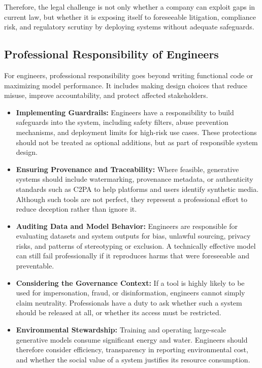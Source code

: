 Therefore, the legal challenge is not only whether a company can exploit gaps in current law, but whether it is exposing itself to foreseeable litigation, compliance risk, and regulatory scrutiny by deploying systems without adequate safeguards.

\subsection{Professional Responsibility of Engineers}

For engineers, professional responsibility goes beyond writing functional code or maximizing model performance. It includes making design choices that reduce misuse, improve accountability, and protect affected stakeholders.

\begin{itemize}
    \item \textbf{Implementing Guardrails:} Engineers have a responsibility to build safeguards into the system, including safety filters, abuse prevention mechanisms, and deployment limits for high-risk use cases. These protections should not be treated as optional additions, but as part of responsible system design.

    \item \textbf{Ensuring Provenance and Traceability:} Where feasible, generative systems should include watermarking, provenance metadata, or authenticity standards such as C2PA to help platforms and users identify synthetic media. Although such tools are not perfect, they represent a professional effort to reduce deception rather than ignore it.

    \item \textbf{Auditing Data and Model Behavior:} Engineers are responsible for evaluating datasets and system outputs for bias, unlawful sourcing, privacy risks, and patterns of stereotyping or exclusion. A technically effective model can still fail professionally if it reproduces harms that were foreseeable and preventable.

    \item \textbf{Considering the Governance Context:} If a tool is highly likely to be used for impersonation, fraud, or disinformation, engineers cannot simply claim neutrality. Professionals have a duty to ask whether such a system should be released at all, or whether its access must be restricted.

    \item \textbf{Environmental Stewardship:} Training and operating large-scale generative models consume significant energy and water. Engineers should therefore consider efficiency, transparency in reporting environmental cost, and whether the social value of a system justifies its resource consumption.
\end{itemize}

